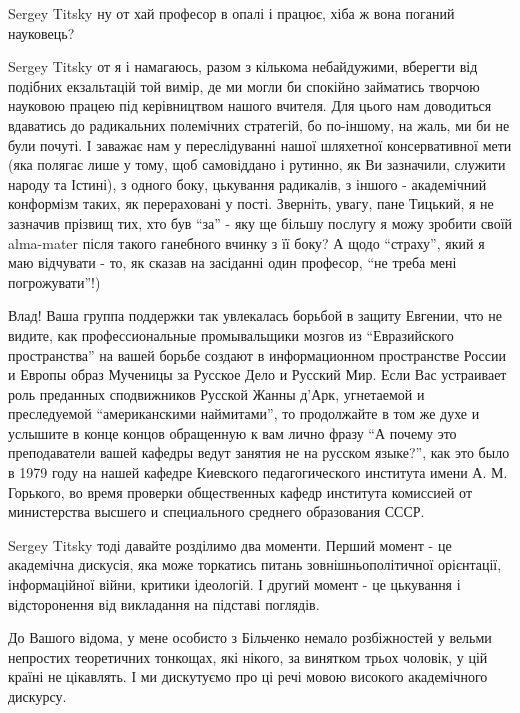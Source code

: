 \begin{itemize}
\begin{itemize}

Sergey Titsky ну от хай професор в опалі і працює, хіба ж вона поганий науковець?


Sergey Titsky от я і намагаюсь, разом з кількома небайдужими, вберегти від
подібних екзальтацій той вимір, де ми могли би спокійно займатись творчою
науковою працею під керівництвом нашого вчителя. Для цього нам доводиться
вдаватись до радикальних полемічних стратегій, бо по-іншому, на жаль, ми би не
були почуті. І заважає нам у переслідуванні нашої шляхетної консервативної мети
(яка полягає лише у тому, щоб самовіддано і рутинно, як Ви зазначили, служити
народу та Істині), з одного боку, цькування радикалів, з іншого - академічний
конформізм таких, як перераховані у пості. Зверніть, увагу, пане Тицький, я не
зазначив прізвищ тих, хто був \enquote{за} - яку ще більшу послугу я можу зробити своїй
alma-mater після такого ганебного вчинку з її боку? А щодо \enquote{страху}, який я маю
відчувати - то, як сказав на засіданні один професор, \enquote{не треба мені
погрожувати}!)


Влад! Ваша группа поддержки так увлекалась борьбой в защиту Евгении, что не
видите, как профессиональные промывальщики мозгов из \enquote{Евразийского
пространства} на вашей борьбе создают в информационном пространстве России и
Европы образ Мученицы за Русское Дело и Русский Мир. Если Вас устраивает роль
преданных сподвижников Русской Жанны д'Арк, угнетаемой и преследуемой
\enquote{американскими наймитами}, то продолжайте в том же духе и услышите в
конце концов обращенную к вам лично фразу \enquote{А почему это преподаватели
вашей кафедры ведут занятия не на русском языке?}, как это было в 1979 году на
нашей кафедре Киевского педагогического института имени А. М. Горького, во время
проверки общественных кафедр института комиссией от министерства высшего и
специального среднего образования СССР.


Sergey Titsky тоді давайте розділимо два моменти. Перший момент - це академічна
дискусія, яка може торкатись питань зовнішньополітичної орієнтації,
інформаційної війни, критики ідеологій. І другий момент - це цькування і
відсторонення від викладання на підставі поглядів. 

До Вашого відома, у мене особисто з Більченко немало розбіжностей у вельми
непростих теоретичних тонкощах, які нікого, за винятком трьох чоловік, у цій
країні не цікавлять. І ми дискутуємо про ці речі мовою високого академічного
дискурсу. 


\end{itemize}
\end{itemize}
